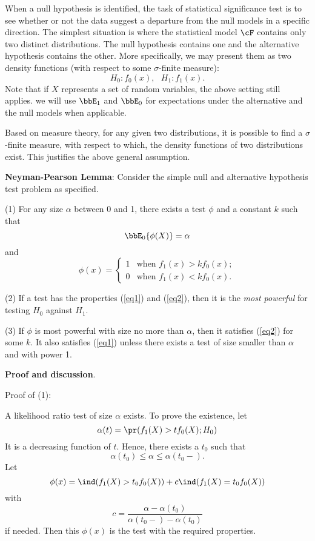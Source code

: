 When a null hypothesis is identified, the task of statistical significance
test is to see whether or not the data suggest a departure from the null models
in a specific direction. The simplest situation is where the statistical
model $\cF$ contains only two distinct distributions. The null hypothesis
contains one and the alternative hypothesis contains the other.
More specifically, we may present them as two density functions
(with respect to some $\sigma$-finite measure):
\[
H_0: f_0(x), ~~~ H_1: f_1(x).
\]
Note that if $X$ represents a set of \iid random variables, the above setting still
applies. 
we will use $\bbE_1$ and $\bbE_0$ for expectations under the alternative and
the null models when applicable.

Based on measure theory, for any given two distributions, it is possible
to find a $\sigma$-finite measure, with respect to which,
the density functions of two distributions exist. This justifies the
above general assumption.

\begin{lemma}
{\bf Neyman-Pearson Lemma}: 
Consider the simple null and alternative
hypothesis test problem as specified.

(1) 
For any size $\alpha$ between $0$ and 1,
there exists a test $\phi$ and a constant $k$ such that
\begin{equation}
\label{eq1}
\bbE_0 \{ \phi(X) \} = \alpha
\end{equation}
and
\begin{equation}
\label{eq2}
\phi(x) = \left \{
\begin{array}{ll}
1 & \mbox{when  } f_1(x) > k f_0(x); \\
0 & \mbox{when  } f_1(x) < k f_0(x).
\end{array}
\right .
\end{equation}

(2) If a test has the properties (\ref{eq1}) and (\ref{eq2}), then it is the 
{\it most powerful} for testing $H_0$ against $H_1$.

(3) If $\phi$ is most powerful with size no more than $\alpha$, then it satisfies
(\ref{eq2}) for some $k$. It also satisfies (\ref{eq1}) unless there exists a test
of size smaller than $\alpha$ and with power 1.

\end{lemma}

\vs
\noindent
{\bf Proof and discussion}. 

\vs \no
Proof of (1):

A likelihood ratio test 
of size $\alpha$ exists. To prove the existence, let
\[
\alpha(t) = \pr ( f_1(X) > t f_0(X); H_0)
\]
It is a decreasing function of $t$.
Hence, there exists a $t_0$ such that
\[
\alpha(t_0) \leq \alpha \leq \alpha(t_0-).
\]
Let
\[
\phi(x) = \ind ( f_1(X) > t_0 f_0(X)) +  c \ind (  f_1(X) = t_0 f_0(X)) 
\]
with 
\[
c = \frac{\alpha - \alpha(t_0)}{\alpha(t_0-) - \alpha(t_0)}
\]
if needed.
Then this $\phi(x)$ is  the test with the required properties.

